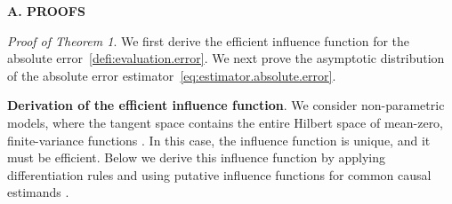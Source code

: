     

\textbf{A. PROOFS}

\textit{Proof of Theorem 1}. 
    We first derive the efficient influence function for the absolute error~\eqref{defi:evaluation.error}. 
    We next prove the asymptotic distribution of the absolute error estimator~\eqref{eq:estimator.absolute.error}.

    
    \noindent \textbf{Derivation of the efficient influence function}. 
    We consider non-parametric models, where the tangent space contains the entire Hilbert space of mean-zero, finite-variance functions \parencite{tsiatis2006semiparametric}.
    In this case, the influence function is unique, and it must be efficient.
    Below we derive this influence function by applying differentiation rules and using putative influence functions for common causal estimands \parencite{kennedy2022semiparametric}.

